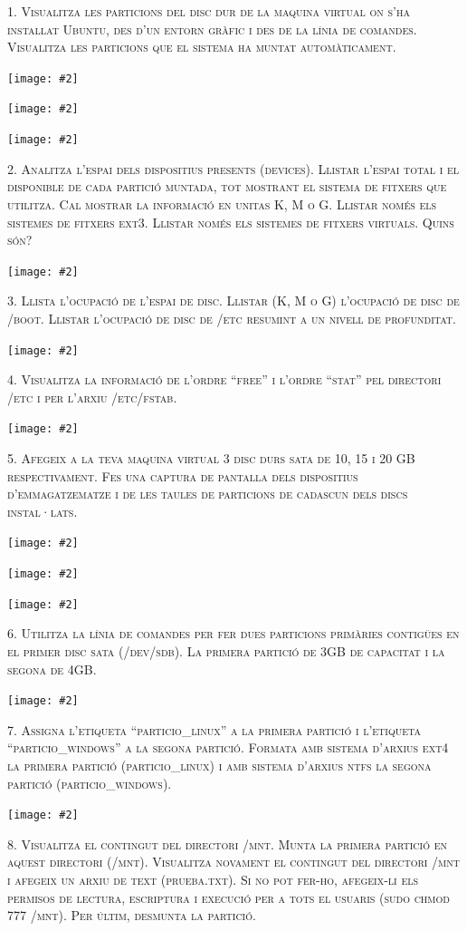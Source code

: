 \documentclass[a4paper,12pt]{article}
\newcommand{\mygraphic}[2][height=0.45\textheight]{\begin{center}
		\centering\texttt{[image: \#2]}\par
\end{center}}
\begin{document}



\newpage
\textsc{1. Visualitza les particions del disc dur de la maquina virtual on s'ha instal\textperiodcentered lat Ubuntu, des d'un entorn gràfic i des de la línia de comandes. Visualitza les particions que el sistema ha muntat automàticament.}

\mygraphic{imatges/1a.png}
\mygraphic{imatges/1b.png}
\mygraphic{imatges/1c.png}

\newpage
\textsc{2. Analitza l'espai dels dispositius presents (devices). Llistar l'espai total i el disponible de cada partició muntada, tot mostrant el sistema de fitxers que utilitza. Cal mostrar la informació en unitas K, M o G. Llistar només els sistemes de fitxers ext3. Llistar només els sistemes de fitxers virtuals. Quins són?}

\mygraphic{imatges/2.png}

\newpage
\textsc{3. Llista l'ocupació de l'espai de disc. Llistar (K, M o G) l'ocupació de disc de /boot. Llistar l'ocupació de disc de /etc resumint a un nivell de profunditat.}

\mygraphic{imatges/3.png}

\newpage
\textsc{4. Visualitza la informació de l'ordre “free” i l'ordre “stat” pel directori /etc i per l'arxiu /etc/fstab.}

\mygraphic{imatges/4.png}

\newpage
\textsc{5. Afegeix a la teva maquina virtual 3 disc durs sata de 10, 15 i 20 GB respectivament. Fes una captura de pantalla dels dispositius d'emmagatzematze i de les taules de particions de cadascun dels discs instal·lats.}

\mygraphic{imatges/5a.png}
\mygraphic{imatges/5b.png}
\mygraphic{imatges/5c.png}

\newpage
\textsc{6. Utilitza la línia de comandes per fer dues particions primàries contigües en el primer disc sata (/dev/sdb). La primera partició de 3GB de capacitat i la segona de 4GB.}

\mygraphic{imatges/6.png}

\newpage
\textsc{7. Assigna l'etiqueta “particio\_linux” a la primera partició i l'etiqueta “particio\_windows” a la segona partició. Formata amb sistema d'arxius ext4 la primera partició (particio\_linux) i amb sistema d'arxius ntfs la segona partició (particio\_windows).}

\mygraphic{imatges/7.png}

\newpage
\textsc{8. Visualitza el contingut del directori /mnt. Munta la primera partició en aquest directori (/mnt). Visualitza novament el contingut del directori /mnt i afegeix un arxiu de text (prueba.txt). Si no pot fer-ho, afegeix-li els permisos de lectura, escriptura i execució per a tots el usuaris (sudo chmod 777 /mnt). Per últim, desmunta la partició.}
\end{document}
